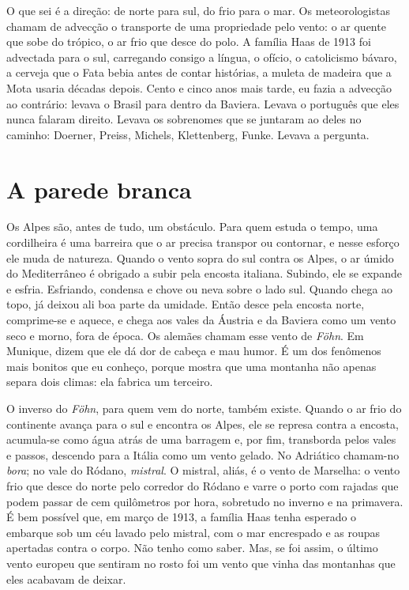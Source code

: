 \documentclass[
  brazilian,
  11pt,
  openany]{book}
\begin{document}
O que sei é a direção: de norte para sul, do frio para o mar. Os
meteorologistas chamam de advecção o transporte de uma propriedade pelo
vento: o ar quente que sobe do trópico, o ar frio que desce do polo. A
família Haas de 1913 foi advectada para o sul, carregando consigo a
língua, o ofício, o catolicismo bávaro, a cerveja que o Fata bebia antes
de contar histórias, a muleta de madeira que a Mota usaria décadas
depois. Cento e cinco anos mais tarde, eu fazia a advecção ao contrário:
levava o Brasil para dentro da Baviera. Levava o português que eles
nunca falaram direito. Levava os sobrenomes que se juntaram ao deles no
caminho: Doerner, Preiss, Michels, Klettenberg, Funke. Levava a
pergunta.

\section{A parede branca}\label{a-parede-branca}

Os Alpes são, antes de tudo, um obstáculo. Para quem estuda o tempo, uma
cordilheira é uma barreira que o ar precisa transpor ou contornar, e
nesse esforço ele muda de natureza. Quando o vento sopra do sul contra
os Alpes, o ar úmido do Mediterrâneo é obrigado a subir pela encosta
italiana. Subindo, ele se expande e esfria. Esfriando, condensa e chove
ou neva sobre o lado sul. Quando chega ao topo, já deixou ali boa parte
da umidade. Então desce pela encosta norte, comprime-se e aquece, e
chega aos vales da Áustria e da Baviera como um vento seco e morno, fora
de época. Os alemães chamam esse vento de \emph{Föhn}. Em Munique, dizem
que ele dá dor de cabeça e mau humor. É um dos fenômenos mais bonitos
que eu conheço, porque mostra que uma montanha não apenas separa dois
climas: ela fabrica um terceiro.

O inverso do \emph{Föhn}, para quem vem do norte, também existe. Quando
o ar frio do continente avança para o sul e encontra os Alpes, ele se
represa contra a encosta, acumula-se como água atrás de uma barragem e,
por fim, transborda pelos vales e passos, descendo para a Itália como um
vento gelado. No Adriático chamam-no \emph{bora}; no vale do Ródano,
\emph{mistral}. O mistral, aliás, é o vento de Marselha: o vento frio
que desce do norte pelo corredor do Ródano e varre o porto com rajadas
que podem passar de cem quilômetros por hora, sobretudo no inverno e na
primavera. É bem possível que, em março de 1913, a família Haas tenha
esperado o embarque sob um céu lavado pelo mistral, com o mar encrespado
e as roupas apertadas contra o corpo. Não tenho como saber. Mas, se foi
assim, o último vento europeu que sentiram no rosto foi um vento que
vinha das montanhas que eles acabavam de deixar.
\end{document}
